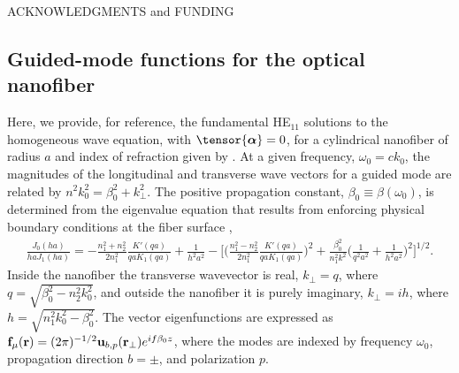 \documentclass[preprint, aps,pra,onecolumn]{revtex4-1} %
\begin{document}
ACKNOWLEDGMENTS and FUNDING

%
%




\begin{appendix}	


\section{Guided-mode functions for the optical nanofiber} \label{Appendix::ModeFunctions}


Here, we provide, for reference, the fundamental HE$_{11}$ solutions to the homogeneous wave equation,  with $\tensor{\boldsymbol{\alpha}} = 0$, for a cylindrical nanofiber of radius $a$ and index of refraction given by .  At a given frequency, $\omega_0 = c k_0$, the magnitudes of the longitudinal and transverse wave vectors for a guided mode are related by $n^2 k_0^2 = \beta_0^2 + k_\perp^2$.  
The positive propagation constant, $\beta_0 \equiv \beta(\omega_0)$, is determined from the eigenvalue equation that results from enforcing physical boundary conditions at the fiber surface \cite{snyder_optical_1983},
	\begin{align}
		\frac{J_0(ha)}{ha J_1(ha)} = - \frac{n_1^2+n_2^2}{2n_1^2} \frac{K'(qa)}{qa K_1(qa)} + \frac{1}{h^2 a^2} - \bigg[ \bigg(\frac{n_1^2 - n_2^2}{2 n_1^2} \frac{K'(qa)}{qa K_1(qa)} \bigg)^2  + \frac{\beta_0^2}{n^2_1 k^2} \bigg(\frac{1}{q^2a^2} + \frac{1}{h^2a^2} \bigg)^2 \bigg]^{1/2}.
	\end{align}
Inside the nanofiber the transverse wavevector is real, $k_\perp = q$, where $q=\sqrt{\beta_0^2- n_2^2k_0^2}$, and outside the nanofiber it is purely imaginary, $k_\perp = i h$, where $h=\sqrt{n_1^2 k_0^2 - \beta_0^2}$.  The vector eigenfunctions are expressed as $\mathbf{f}_{\mu}(\mathbf{r}) = (2\pi)^{-1/2}\mathbf{u}_{b,p}(\mathbf{r}_\perp) e^{i f \beta_0 z}$, where the modes are indexed by frequency $\omega_0$, propagation direction $b = \pm$, and polarization $p$.


\end{appendix}
\end{document}
